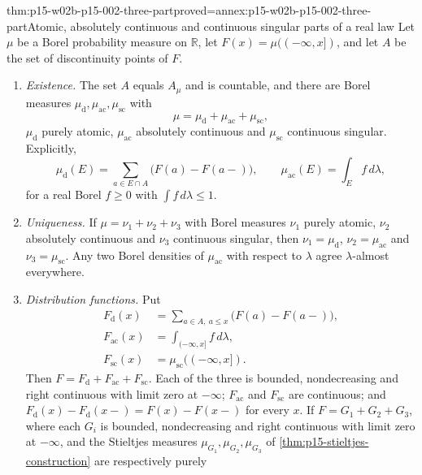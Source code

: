 \begin{hbtheorem}{thm:p15-w02b-p15-002-three-part}{proved=annex:p15-w02b-p15-002-three-part}{Atomic, absolutely continuous and continuous singular parts of a real law}
Let \(\mu\) be a Borel probability measure on \(\mathbb R\), let
\(F(x)=\mu((-\infty,x])\), and let \(A\) be the set of discontinuity
points of \(F\).
\begin{enumerate}
\item \emph{Existence.} The set \(A\) equals \(A_\mu\) and is
      countable, and there are Borel measures
      \(\mu_{\mathrm d},\mu_{\mathrm{ac}},\mu_{\mathrm{sc}}\) with
      \[
       \mu=\mu_{\mathrm d}+\mu_{\mathrm{ac}}+\mu_{\mathrm{sc}},
      \]
      \(\mu_{\mathrm d}\) purely atomic, \(\mu_{\mathrm{ac}}\)
      absolutely continuous and \(\mu_{\mathrm{sc}}\) continuous singular.
      Explicitly,
      \[
       \mu_{\mathrm d}(E)=\sum_{a\in E\cap A}\bigl(F(a)-F(a-)\bigr),
       \qquad
       \mu_{\mathrm{ac}}(E)=\int_E f\,d\lambda,
      \]
      for a real Borel \(f\geq0\) with \(\int f\,d\lambda\leq1\).
\item \emph{Uniqueness.} If \(\mu=\nu_1+\nu_2+\nu_3\) with Borel measures
      \(\nu_1\) purely atomic, \(\nu_2\) absolutely continuous and
      \(\nu_3\) continuous singular, then \(\nu_1=\mu_{\mathrm d}\),
      \(\nu_2=\mu_{\mathrm{ac}}\) and \(\nu_3=\mu_{\mathrm{sc}}\).
      Any two Borel densities of \(\mu_{\mathrm{ac}}\) with respect to
      \(\lambda\) agree \(\lambda\)-almost everywhere.
\item \emph{Distribution functions.} Put
      \[
       \begin{aligned}
       F_{\mathrm d}(x)&=\sum_{a\in A,\ a\leq x}\bigl(F(a)-F(a-)\bigr),\\
       F_{\mathrm{ac}}(x)&=\int_{(-\infty,x]}f\,d\lambda,\\
       F_{\mathrm{sc}}(x)&=\mu_{\mathrm{sc}}((-\infty,x]).
       \end{aligned}
      \]
      Then \(F=F_{\mathrm d}+F_{\mathrm{ac}}+F_{\mathrm{sc}}\). Each of the
      three is bounded, nondecreasing and right continuous with limit zero
      at \(-\infty\); \(F_{\mathrm{ac}}\) and \(F_{\mathrm{sc}}\) are
      continuous; and \(F_{\mathrm d}(x)-F_{\mathrm d}(x-)=F(x)-F(x-)\) for
      every \(x\). If \(F=G_1+G_2+G_3\), where each \(G_i\) is bounded,
      nondecreasing and right continuous with limit zero at \(-\infty\),
      and the Stieltjes measures \(\mu_{G_1},\mu_{G_2},\mu_{G_3}\) of
      \cref{thm:p15-stieltjes-construction} are respectively purely

\end{enumerate}
\end{hbtheorem}
